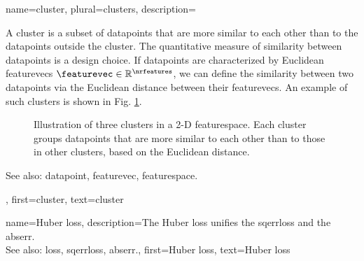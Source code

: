 {name={cluster}, plural={clusters}, 
	description={A cluster is a subset of 
		\glspl{datapoint} that are more similar to each other than to the \glspl{datapoint} outside the cluster. 
		The quantitative measure of similarity between \glspl{datapoint} is a design choice. If \glspl{datapoint} 
		are characterized by Euclidean \glspl{featurevec} $\featurevec \in \mathbb{R}^{\nrfeatures}$, 
		we can define the similarity between two \glspl{datapoint} via the Euclidean distance between 
		their \glspl{featurevec}. An example of such clusters is shown in Fig. \ref{fig:clusters_dict}.\\
		\begin{figure}[H]
		\centering
		\caption{Illustration of three clusters in a 2-D \gls{featurespace}. Each cluster groups \glspl{datapoint} 
		that are more similar to each other than to those in other clusters, based on the Euclidean distance.}
		\label{fig:clusters_dict}
		\end{figure}
		See also: \gls{datapoint}, \gls{featurevec}, \gls{featurespace}.},
	first={cluster},
	text={cluster} 
}


{name={Huber loss}, 
	description={The 
		Huber \gls{loss} unifies the \gls{sqerrloss} and the \gls{abserr}.
				\\
		See also: \gls{loss}, \gls{sqerrloss}, \gls{abserr}.},
	first={Huber loss},
	text={Huber loss} 
}


